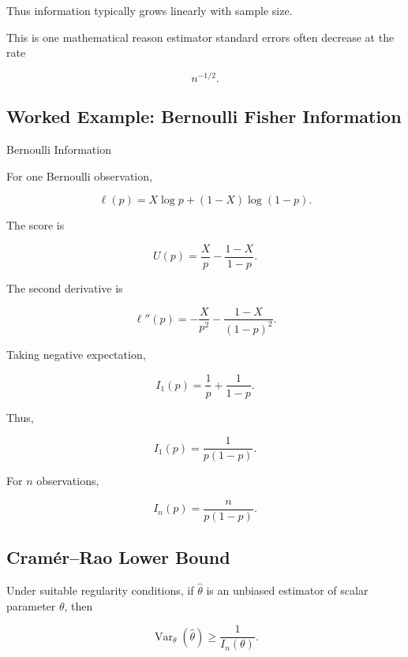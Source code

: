 Thus information typically grows linearly with sample size.

This is one mathematical reason estimator standard errors often decrease
at the rate

\[
\boxed{
n^{-1/2}.
}
\]

\subsection{Worked Example: Bernoulli Fisher Information}
\label{subsec:worked-bernoulli-information}

\begin{workedexamplebox}{Bernoulli Information}

For one Bernoulli observation,

\[
\ell(p)
=
X\log p
+
(1-X)\log(1-p).
\]

The score is

\[
U(p)
=
\frac{X}{p}
-
\frac{1-X}{1-p}.
\]

The second derivative is

\[
\ell''(p)
=
-
\frac{X}{p^2}
-
\frac{1-X}{(1-p)^2}.
\]

Taking negative expectation,

\[
I_1(p)
=
\frac1p
+
\frac1{1-p}.
\]

Thus,

\begin{answerbox}
\[
\boxed{
I_1(p)
=
\frac1{
p(1-p)
}.
}
\]

For \(n\) observations,

\[
\boxed{
I_n(p)
=
\frac{
n
}{
p(1-p)
}.
}
\]
\end{answerbox}

\end{workedexamplebox}

\subsection{Cramér--Rao Lower Bound}
\label{subsec:cramer-rao-lower-bound}

\begin{theorem}
Under suitable regularity conditions, if \(\widehat{\theta}\) is an
unbiased estimator of scalar parameter \(\theta\), then

\[
\boxed{
\operatorname{Var}_\theta
(
\widehat{\theta}
)
\geq
\frac1{
I_n(\theta)
}.
}
\]
\end{theorem}


